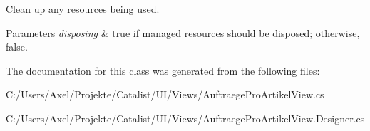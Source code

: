 Clean up any resources being used. 


\begin{DoxyParams}{Parameters}
{\em disposing} & true if managed resources should be disposed; otherwise, false.\\
\hline
\end{DoxyParams}


The documentation for this class was generated from the following files\+:\begin{DoxyCompactItemize}
\item 
C\+:/\+Users/\+Axel/\+Projekte/\+Catalist/\+U\+I/\+Views/Auftraege\+Pro\+Artikel\+View.\+cs\item 
C\+:/\+Users/\+Axel/\+Projekte/\+Catalist/\+U\+I/\+Views/Auftraege\+Pro\+Artikel\+View.\+Designer.\+cs\end{DoxyCompactItemize}
